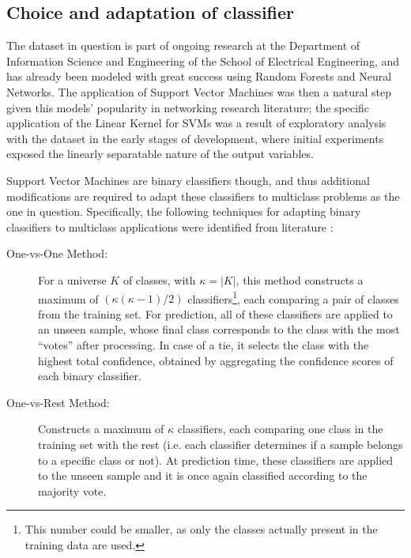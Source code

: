 \documentclass{kthreport}
\theoremstyle{definition}
\begin{document}


\subsection{Choice and adaptation of classifier}\label{sec:cfchoice}

The dataset in question is part of ongoing research at the Department of Information Science and Engineering of the School of Electrical Engineering, and has already been modeled with great success using Random Forests and Neural Networks. The application of Support Vector Machines was then a natural step given this models' popularity in networking research literature; the specific application of the Linear Kernel for SVMs was a result of exploratory analysis with the dataset in the early stages of development, where initial experiments exposed the linearly separatable nature of the output variables.

Support Vector Machines are binary classifiers though, and thus additional modifications are required to adapt these classifiers to multiclass problems as the one in question. Specifically, the following techniques for adapting binary classifiers to multiclass applications were identified from literature \autocite{hsu2002comparison,tax2002multiclass}:

\begin{description}
	\item[One-vs-One Method:] For a universe $K$ of classes, with $\kappa = |K|$, this method constructs a maximum of $(\kappa(\kappa-1)/2)$ classifiers\footnote{This number could be smaller, as only the classes actually present in the training data are used.}, each comparing a pair of classes from the training set. For prediction, all of these classifiers are applied to an unseen sample, whose final class corresponds to the class with the most ``votes'' after processing. In case of a tie, it selects the class with the highest total confidence, obtained by aggregating the confidence scores of each binary classifier.
	\item[One-vs-Rest Method:] Constructs a maximum of $\kappa$ classifiers, each comparing one class in the training set with the rest (i.e. each classifier determines if a sample belongs to a specific class or not). At prediction time, these classifiers are applied to the unseen sample and it is once again classified according to the majority vote.
\end{description}
\end{document}
